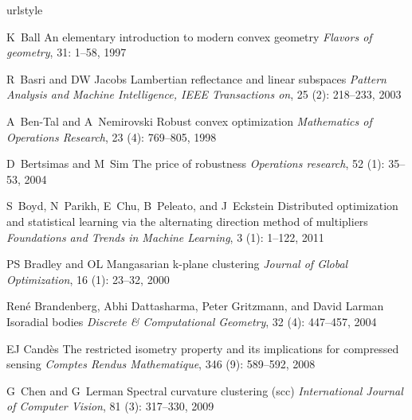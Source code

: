 \documentclass[12pt,heading]{ctexbook}
\begin{document}




\begin{thebibliography}{99}
    \providecommand{\natexlab}[1]{#1}
    \providecommand{\url}[1]{\texttt{#1}}
    \expandafter\ifx\csname urlstyle\endcsname\relax
    \providecommand{\doi}[1]{doi: #1}\else
    \providecommand{\doi}{doi: \begingroup \urlstyle{rm}\Url}\fi

    K~Ball
    \newblock An elementary introduction to modern convex geometry
    \newblock \emph{Flavors of geometry}, 31: 1--58, 1997

    R~Basri and DW Jacobs
    \newblock Lambertian reflectance and linear subspaces
    \newblock \emph{Pattern Analysis and Machine Intelligence, IEEE Transactions
    on}, 25 (2): 218--233, 2003

    A~Ben-Tal and A~Nemirovski
    \newblock Robust convex optimization
    \newblock \emph{Mathematics of Operations Research}, 23 (4):
    769--805, 1998

    D~Bertsimas and M~Sim
    \newblock The price of robustness
    \newblock \emph{Operations research}, 52 (1): 35--53, 2004

    S~Boyd, N~Parikh, E~Chu, B~Peleato, and J~Eckstein
    \newblock Distributed optimization and statistical learning via the alternating
    direction method of multipliers
    \newblock \emph{Foundations and Trends{\textregistered} in Machine Learning},
    3 (1): 1--122, 2011

    PS Bradley and OL Mangasarian
    \newblock k-plane clustering
    \newblock \emph{Journal of Global Optimization}, 16 (1):
    23--32, 2000

    Ren{\'e} Brandenberg, Abhi Dattasharma, Peter Gritzmann, and David Larman
    \newblock Isoradial bodies
    \newblock \emph{Discrete \& Computational Geometry}, 32 (4):
    447--457, 2004

    EJ Cand{\`e}s
    \newblock The restricted isometry property and its implications for compressed
    sensing
    \newblock \emph{Comptes Rendus Mathematique}, 346 (9):
    589--592, 2008

    G~Chen and G~Lerman
    \newblock Spectral curvature clustering (scc)
    \newblock \emph{International Journal of Computer Vision}, 81
    (3): 317--330, 2009


\end{thebibliography}
\end{document}
